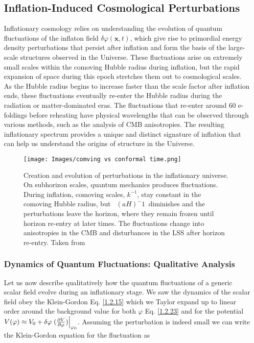 \subsection{Inflation-Induced Cosmological Perturbations} \label{section 1.7.4}
 Inflationary cosmology relies on understanding the evolution of quantum fluctuations of the inflaton field $\delta \varphi(\mathbf{x},t)$, which give rise to primordial energy density perturbations that persist after inflation and form the basis of the large-scale structures observed in the Universe. These fluctuations arise on extremely small scales within the comoving Hubble radius during inflation, but the rapid expansion of space during this epoch stretches them out to cosmological scales. As the Hubble radius begins to increase faster than the scale factor after inflation ends, these fluctuations eventually re-enter the Hubble radius during the radiation or matter-dominated eras. The fluctuations that re-enter around 60 e-foldings before reheating have physical wavelengths that can be observed through various methods, such as the analysis of CMB anisotropies. The resulting inflationary spectrum provides a unique and distinct signature of inflation that can help us understand the origins of structure in the Universe. \\

 \begin{figure}[ht]
    \centering
    \texttt{[image: Images/comving vs conformal time.png]}
    \caption{Creation and evolution of perturbations in the inflationary universe. On subhorizon scales, quantum mechanics produces fluctuations. During inflation, comoving scales, $k^{-1}$, stay constant in the comoving Hubble radius, but  $(aH)^-{1}$ diminishes and the perturbations leave the horizon, where they remain frozen until horizon re-entry at later times. The fluctuations change into anisotropies in the CMB and disturbances in the LSS after horizon re-entry. Taken from \cite{baumann2012tasi}}
    \label{fig:1.3} 
\end{figure}

\subsubsection{Dynamics of Quantum Fluctuations: Qualitative Analysis}

 \hspace{0.5cm} Let us now describe qualitatively how the quantum fluctuations of a generic scalar field evolve during an inflationary stage. We saw the dynamics of the scalar field obey the Klein-Gordon Eq. \eqref{1.2.15} which we Taylor expand up to linear order around the background value for both $\varphi$ Eq. \eqref{1.2.23} and for the potential \(V(\varphi ) \approx V_0 + \delta \varphi \eval{(\pdv{V}{\varphi })}_{\varphi_0 }\). Assuming the perturbation is indeed small we can write the Klein-Gordon equation for the fluctuation as

